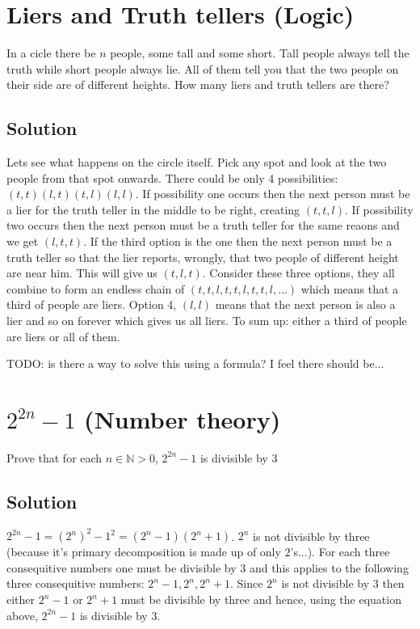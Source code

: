 \documentclass{article}
\begin{document}
\section{Liers and Truth tellers (Logic)}
In a cicle there be $n$ people, some tall and some short. Tall people always tell the truth while short people always lie. All of them tell you that the two people on their side are of different heights. How many liers and truth tellers are there?

\subsection{Solution}
Lets see what happens on the circle itself. Pick any spot and look at the two people from that spot onwards. There could be only 4 possibilities: $(t,t) (l,t) (t,l) (l,l)$. If possibility one occurs then the next person must be a lier for the truth teller in the middle to be right, creating $(t,t,l)$. If possibility two occurs then the next person must be a truth teller for the same reaons and we get $(l,t,t)$. If the third option is the one then the next person must be a truth teller so that the lier reports, wrongly, that two people of different height are near him. This will give us $(t,l,t)$. Consider these three options, they all combine to form an endless chain of $(t,t,l,t,t,l,t,t,l,...)$ which means that a third of people are liers. Option 4, $(l,l)$ means that the next person is also a lier and so on forever which gives us all liers. To sum up: either a third of people are liers or all of them.

TODO: is there a way to solve this using a formula? I feel there should be...

\section{$2^{2n}-1$ (Number theory)}
Prove that for each $n\in \mathbb{N}>0$, $2^{2n}-1$ is divisible by 3

\subsection{Solution}
$2^{2n}-1=(2^{n})^2-1^2=(2^n-1)(2^n+1)$.
$2^n$ is not divisible by three (because it's primary decomposition is made up of only $2$'s...).
For each three consequitive numbers one must be divisible by $3$ and this applies to the following
three consequitive numbers: $2^n-1,2^n,2^n+1$. Since $2^n$ is not divisible by $3$ then either
$2^n-1$ or $2^n+1$ must be divisible by three and hence, using the equation above, $2^{2n}-1$ is
divisible by $3$.
\end{document}
